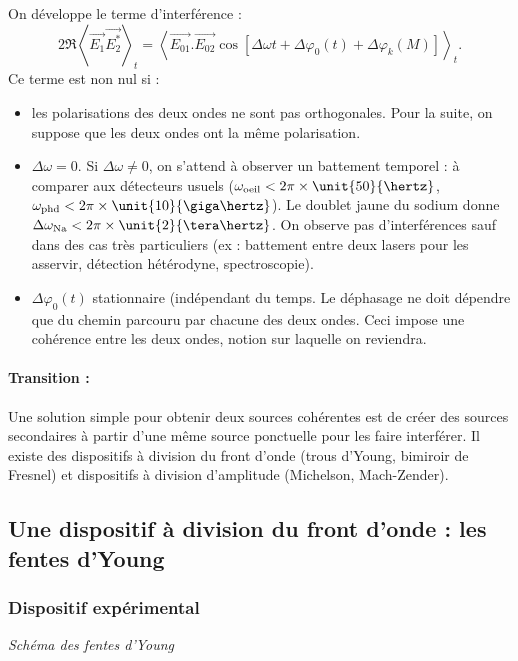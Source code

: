 On développe le terme d'interférence :
\begin{equation}
2\Re \left< \overrightarrow{E_1} \overrightarrow{E_2^*} \right>_t =
\left<
\overrightarrow{E_{01}}.\overrightarrow{E_{02}}
\cos\left[ \Delta \omega t + \Delta \varphi_0(t) + \Delta\varphi_k(M)\right]
\right>_t.
\end{equation}
Ce terme est non nul si :
\begin{itemize}
\item les polarisations des deux ondes ne sont pas orthogonales.
Pour la suite, on suppose que les deux ondes ont la même polarisation.
\item  $\Delta\omega = 0$.
Si $\Delta\omega \neq 0$, on s'attend à observer un battement temporel : à comparer aux détecteurs usuels ($\omega_\mathrm{oeil} < 2\pi\times\unit{50}{\hertz}$, $\omega_\mathrm{phd} < 2\pi\times\unit{10}{\giga\hertz}$).
Le doublet jaune du sodium donne $\Delta\omega_\mathrm{Na} < 2\pi\times\unit{2}{\tera\hertz}$.
On observe pas d'interférences sauf dans des cas très particuliers (ex : battement entre deux lasers pour les asservir, détection hétérodyne, spectroscopie).
\item $\Delta\varphi_0(t)$ stationnaire (indépendant du temps.
Le déphasage ne doit dépendre que du chemin parcouru par chacune des deux ondes.
Ceci impose une cohérence entre les deux ondes, notion sur laquelle on reviendra.
\end{itemize}

\paragraph{Transition :}
Une solution simple pour obtenir deux sources cohérentes est de créer des sources secondaires à partir d'une même source ponctuelle pour les faire interférer. 
Il existe des dispositifs à division du front d'onde (trous d'Young, bimiroir de Fresnel) et dispositifs à division d'amplitude (Michelson, Mach-Zender).

\subsection{Une dispositif à division du front d'onde : les fentes d'Young}

\subsubsection{Dispositif expérimental}

\emph{Schéma des fentes d'Young}

